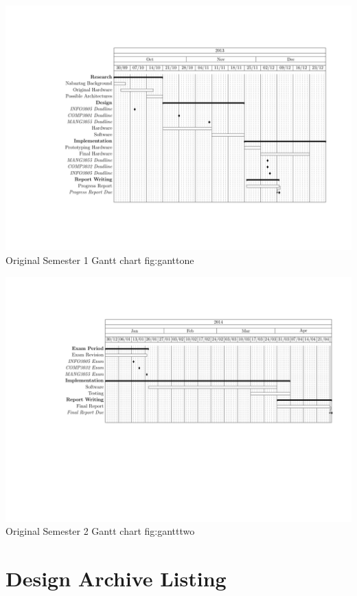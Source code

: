 \documentclass[12pt, a4paper]{article}
\begin{document}
\begin{appendices}
	{\includegraphics[scale=0.96]{images/origganttone}}
	{Original Semester 1 Gantt chart}
	{fig:ganttone}

	{\includegraphics[scale=1]{images/origgantttwo}}
	{Original Semester 2 Gantt chart}
	{fig:gantttwo}
	
\cleardoublepage

\section{Design Archive Listing}\label{app:filelisting}


\end{appendices}
\end{document}
